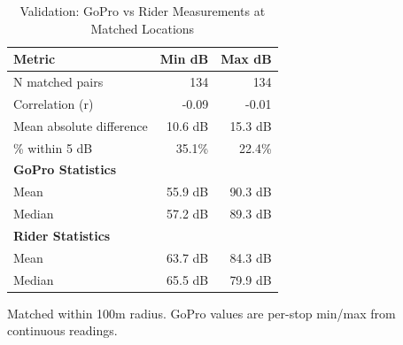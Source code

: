 \begin{table}[htbp]
\centering
\caption{Validation: GoPro vs Rider Measurements at Matched Locations}
\label{tab:validation}
\begin{tabular}{lrr}
\toprule
Metric & Min dB & Max dB \\
\midrule
N matched pairs & 134 & 134 \\
Correlation (r) & -0.09 & -0.01 \\
Mean absolute difference & 10.6 dB & 15.3 dB \\
\% within 5 dB & 35.1\% & 22.4\% \\
\midrule
\multicolumn{3}{l}{\textbf{GoPro Statistics}} \\
Mean & 55.9 dB & 90.3 dB \\
Median & 57.2 dB & 89.3 dB \\
\midrule
\multicolumn{3}{l}{\textbf{Rider Statistics}} \\
Mean & 63.7 dB & 84.3 dB \\
Median & 65.5 dB & 79.9 dB \\
\bottomrule
\end{tabular}
\begin{tablenotes}
\small
\item Matched within 100m radius. GoPro values are per-stop min/max from continuous readings.
\end{tablenotes}
\end{table}
